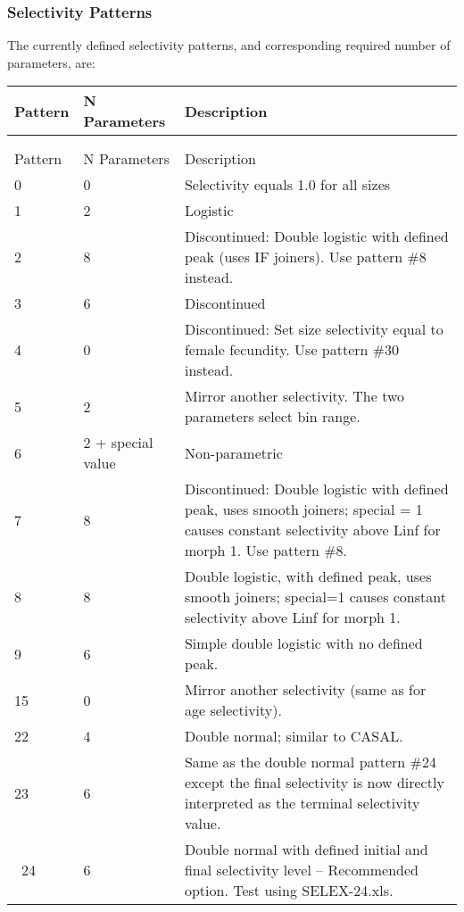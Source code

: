 \subsubsection{Selectivity Patterns}
The currently defined selectivity patterns, and corresponding required number of parameters, are:

\begin{center}
	\begin{longtable}{p{2cm} p{3cm} p{10cm}}
		\endfirsthead

		\hline
		Pattern & N Parameters & Description \\
		\hline
		\endhead

		\endfoot
		\endlastfoot

		\hline
		\multicolumn{3}{c}{SIZE SELECTIVITY}\\
		  &   &  \\
		Pattern & N Parameters & Description \\
		\hline
		0 & 0 & Selectivity equals 1.0 for all sizes \\
		1 & 2 & Logistic \\
		2 & 8 & Discontinued: Double logistic with defined peak (uses IF joiners). Use pattern \#8 instead.\\
		3 & 6 & Discontinued \\
		4 & 0 & Discontinued: Set size selectivity equal to female fecundity. Use pattern \#30 instead.\\
		5 & 2 & Mirror another selectivity. The two parameters select bin range.\\
		6 & 2 + special value & Non-parametric \\
		7 & 8 & Discontinued: Double logistic with defined peak, uses smooth joiners; special = 1 causes constant selectivity above Linf for morph 1.  Use pattern \#8.\\
		8 & 8 & Double logistic, with defined peak, uses smooth joiners; special=1 causes constant selectivity above Linf for morph 1.  \\
		9 & 6 & Simple double logistic with no defined peak.\\
		15 & 0 & Mirror another selectivity (same as for age selectivity).\\
		22 & 4 & Double normal; similar to CASAL.\\
		23 & 6 & Same as the double normal pattern \#24 except the final selectivity is now directly interpreted as the terminal selectivity value.\\\
		24 & 6 & Double normal with defined initial and final selectivity level – Recommended option.  Test using SELEX-24.xls. \\

\end{longtable}
\end{center}

